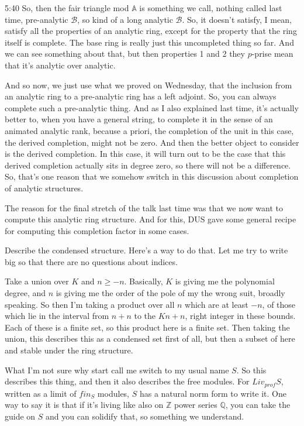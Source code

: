 \begin{unfinished}{5:40}
So, then the fair triangle mod $\mathbb{A}$ is something we call, nothing called last time, pre-analytic $\mathscr{B}$, so kind of a long analytic $\mathscr{B}$. So, it doesn't satisfy, I mean, satisfy all the properties of an analytic ring, except for the property that the ring itself is complete. The base ring is really just this uncompleted thing so far. And we can see something about that, but then properties 1 and 2 they $p$-prise mean that it's analytic over analytic.

And so now, we just use what we proved on Wednesday, that the inclusion from an analytic ring to a pre-analytic ring has a left adjoint. So, you can always complete such a pre-analytic thing. And as I also explained last time, it's actually better to, when you have a general string, to complete it in the sense of an animated analytic rank, because a priori, the completion of the unit in this case, the derived completion, might not be zero. And then the better object to consider is the derived completion. In this case, it will turn out to be the case that this derived completion actually sits in degree zero, so there will not be a difference. So, that's one reason that we somehow switch in this discussion about completion of analytic structures.

The reason for the final stretch of the talk last time was that we now want to compute this analytic ring structure. And for this, DUS gave some general recipe for computing this completion factor in some cases.

Describe the condensed structure. Here's a way to do that. Let me try to write big so that there are no questions about indices.

Take a union over $K$ and $n \geq -n$. Basically, $K$ is giving me the polynomial degree, and $n$ is giving me the order of the pole of my the wrong suit, broadly speaking. So then I'm taking a product over all $n$ which are at least $-n$, of those which lie in the interval from $n + n$ to the $Kn + n$, right integer in these bounds. Each of these is a finite set, so this product here is a finite set. Then taking the union, this describes this as a condensed set first of all, but then a subset of here and stable under the ring structure.

What I'm not sure why start call me switch to my usual name $S$. So this describes this thing, and then it also describes the free modules. For $Liv_{prof} S$, written as a limit of $fin_S$ modules, $S$ has a natural norm form to write it. One way to say it is that if it's living like also on $\mathbb{Z}$ power series $\mathbb{Q}$, you can take the guide on $S$ and you can solidify that, so something we understand.


\end{unfinished}
